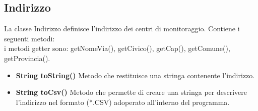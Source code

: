 \documentclass[a4paper, 12pt]{report}
\begin{document}
			\subsection{Indirizzo}
			La classe Indirizzo definisce l'indirizzo dei centri di monitoraggio. Contiene i seguenti metodi:\\
			i metodi getter sono: getNomeVia(), getCivico(), getCap(), getComune(), getProvincia().
			\begin{itemize}
			\item \textbf{String toString()}
			Metodo che restituisce una stringa contenente l'indirizzo.
			\item \textbf{String toCsv()}
			Metodo che permette di creare una stringa per descrivere l'indirizzo nel formato (*.CSV) adoperato all'interno del programma.
			\end{itemize}
\end{document}
